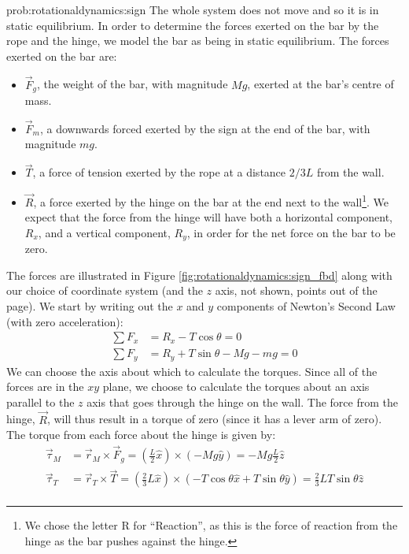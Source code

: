 \begin{solution}{prob:rotationaldynamics:sign}\label{soln:rotationaldynamics:sign}
The whole system does not move and so it is in static equilibrium. In order to determine the forces exerted on the bar by the rope and the hinge, we model the bar as being in static equilibrium. The forces exerted on the bar are:
\begin{itemize}
\item $\vec F_g$, the weight of the bar, with magnitude $Mg$, exerted at the bar's centre of mass.
\item $\vec F_m$, a downwards forced exerted by the sign at the end of the bar, with magnitude $mg$.
\item $\vec T$, a force of tension exerted by the rope at a distance $2/3 L$ from the wall.
\item $\vec R$, a force exerted by the hinge on the bar at the end next to the wall\footnote{We chose the letter R for ``Reaction'', as this is the force of reaction from the hinge as the bar pushes against the hinge.}. We expect that the force from the hinge will have both a horizontal component, $R_x$, and a vertical component, $R_y$, in order for the net force on the bar to be zero.
\end{itemize}
The forces are illustrated in Figure \ref{fig:rotationaldynamics:sign_fbd} along with our choice of coordinate system (and the $z$ axis, not shown, points out of the page).
We start by writing out the $x$ and $y$ components of Newton's Second Law (with zero acceleration):
\begin{align*}
\sum F_x &= R_x - T\cos\theta =0\\
\sum F_y &= R_y + T\sin\theta - Mg - mg=0
\end{align*}
We can choose the axis about which to calculate the torques. Since all of the forces are in the $xy$ plane, we choose to calculate the torques about an axis parallel to the $z$ axis that goes through the hinge on the wall. The force from the hinge, $\vec R$, will thus result in a torque of zero (since it has a lever arm of zero). The torque from each force about the hinge is given by:
\begin{align*}
\vec \tau_M &= \vec r_M \times \vec F_g = \left(\frac{L}{2}\hat x\right) \times (-Mg \hat y) =-Mg\frac{L}{2} \hat z\\
\vec \tau_T &= \vec r_T \times \vec T = \left(\frac{2}{3}L\hat x\right) \times (-T\cos\theta \hat x + T\sin\theta \hat y) =\frac{2}{3}LT\sin\theta \hat z\\

\end{align*}
\end{solution}
